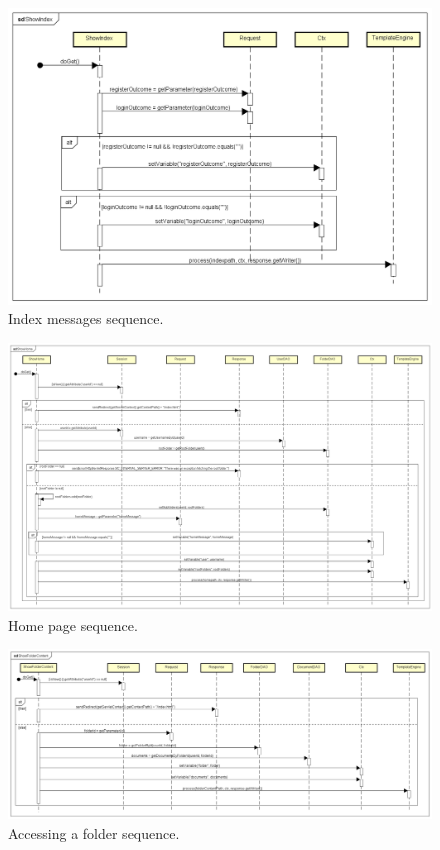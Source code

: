 \documentclass[a4paper,12pt]{article}
\begin{document}
\begin{figure}[H]
    \centering
    \includegraphics[width=1.0\textwidth]{HTML/SequenceDiagram/ShowIndex.png}
    \caption{Index messages sequence.}
\end{figure}

\begin{figure}[H]
    \centering
    \includegraphics[width=1.0\textwidth]{HTML/SequenceDiagram/ShowHome.png}
    \caption{Home page sequence.}
\end{figure}

\begin{figure}[H]
    \centering
    \includegraphics[width=1.0\textwidth]{HTML/SequenceDiagram/ShowFolderContent.png}
    \caption{Accessing a folder sequence.}
\end{figure}
    
\end{document}
